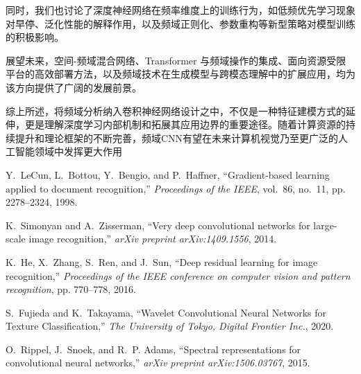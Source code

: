 \documentclass[12pt]{article}
\begin{document}
同时，我们也讨论了深度神经网络在频率维度上的训练行为，如低频优先学习现象对早停、泛化性能的解释作用，以及频域正则化、参数重构等新型策略对模型训练的积极影响。

展望未来，空间-频域混合网络、Transformer 与频域操作的集成、面向资源受限平台的高效部署方法，以及频域技术在生成模型与跨模态理解中的扩展应用，均为该方向提供了广阔的发展前景。

综上所述，将频域分析纳入卷积神经网络设计之中，不仅是一种特征建模方式的延伸，更是理解深度学习内部机制和拓展其应用边界的重要途径。随着计算资源的持续提升和理论框架的不断完善，频域CNN有望在未来计算机视觉乃至更广泛的人工智能领域中发挥更大作用



\begin{thebibliography}{99}

Y.~LeCun, L.~Bottou, Y.~Bengio, and P.~Haffner,
``Gradient-based learning applied to document recognition,''
\emph{Proceedings of the IEEE}, vol.~86, no.~11, pp. 2278--2324, 1998.

K.~Simonyan and A.~Zisserman,
``Very deep convolutional networks for large-scale image recognition,''
\emph{arXiv preprint arXiv:1409.1556}, 2014.

K.~He, X.~Zhang, S.~Ren, and J.~Sun,
``Deep residual learning for image recognition,''
\emph{Proceedings of the IEEE conference on computer vision and pattern recognition}, pp. 770--778, 2016.

S.~Fujieda and K.~Takayama,
``Wavelet Convolutional Neural Networks for Texture Classification,''
\emph{The University of Tokyo, Digital Frontier Inc.}, 2020.

O.~Rippel, J.~Snoek, and R.~P. Adams, 
``Spectral representations for convolutional neural networks,'' 
\emph{arXiv preprint arXiv:1506.03767}, 2015.

\end{thebibliography}
\end{document}
